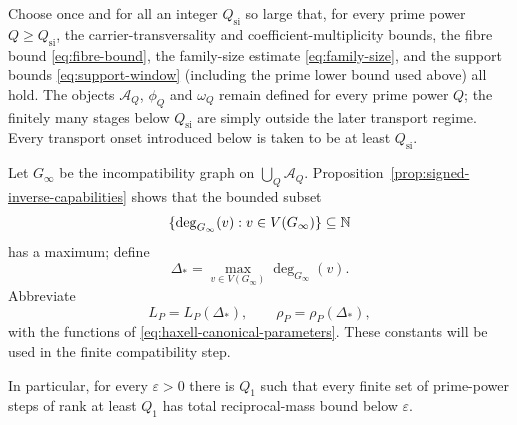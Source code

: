 Choose once and for all an integer $Q_{\mathrm{si}}$ so large that, for every prime power $Q\ge Q_{\mathrm{si}}$, the carrier-transversality and coefficient-multiplicity bounds, the fibre bound \eqref{eq:fibre-bound}, the family-size estimate \eqref{eq:family-size}, and the support bounds \eqref{eq:support-window} (including the prime lower bound used above) all hold.  The objects $\mathcal A_Q$, $\phi_Q$ and $\omega_Q$ remain defined for every prime power $Q$; the finitely many stages below $Q_{\mathrm{si}}$ are simply outside the later transport regime.  Every transport onset introduced below is taken to be at least $Q_{\mathrm{si}}$.

Let $G_{\infty}$ be the incompatibility graph on $\bigcup_Q\mathcal A_Q$.  Proposition~\ref{prop:signed-inverse-capabilities} shows that the bounded subset
\[
\{\deg_{G_{\infty}}(v):v\in V(G_{\infty})\}\subseteq\mathbb N
\]
has a maximum; define
\begin{equation}\label{eq:canonical-global-degree}
\Delta_*=\max_{v\in V(G_{\infty})}\deg_{G_{\infty}}(v).
\end{equation}
Abbreviate
\begin{equation}\label{eq:packing-constants}
L_P=L_P(\Delta_*),
\qquad
\rho_P=\rho_P(\Delta_*),
\end{equation}
with the functions of \eqref{eq:haxell-canonical-parameters}.  These constants will be used in the finite compatibility step.

In particular, for every $\varepsilon>0$ there is $Q_1$ such that every finite set of prime-power steps of rank at least $Q_1$ has total reciprocal-mass bound below $\varepsilon$.
